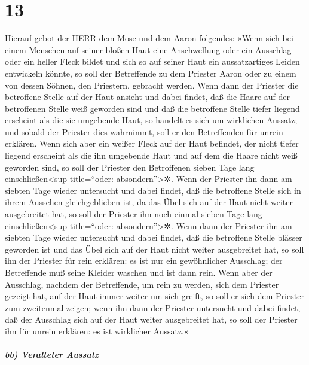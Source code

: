 \hypertarget{section-12}{%
\section{13}\label{section-12}}

Hierauf gebot der HERR dem Mose und dem Aaron folgendes:
»Wenn sich bei einem Menschen auf seiner bloßen Haut eine
Anschwellung oder ein Ausschlag oder ein heller Fleck bildet und sich so
auf seiner Haut ein aussatzartiges Leiden entwickeln könnte, so soll der
Betreffende zu dem Priester Aaron oder zu einem von dessen Söhnen, den
Priestern, gebracht werden. Wenn dann der Priester die
betroffene Stelle auf der Haut ansieht und dabei findet, daß die Haare
auf der betroffenen Stelle weiß geworden sind und daß die betroffene
Stelle tiefer liegend erscheint als die sie umgebende Haut, so handelt
es sich um wirklichen Aussatz; und sobald der Priester dies wahrnimmt,
soll er den Betreffenden für unrein erklären. Wenn sich
aber ein weißer Fleck auf der Haut befindet, der nicht tiefer liegend
erscheint als die ihn umgebende Haut und auf dem die Haare nicht weiß
geworden sind, so soll der Priester den Betroffenen sieben Tage lang
einschließen\textless sup title=``oder: absondern''\textgreater✲.
Wenn der Priester ihn dann am siebten Tage wieder
untersucht und dabei findet, daß die betroffene Stelle sich in ihrem
Aussehen gleichgeblieben ist, da das Übel sich auf der Haut nicht weiter
ausgebreitet hat, so soll der Priester ihn noch einmal sieben Tage lang
einschließen\textless sup title=``oder: absondern''\textgreater✲.
Wenn dann der Priester ihn am siebten Tage wieder
untersucht und dabei findet, daß die betroffene Stelle blässer geworden
ist und das Übel sich auf der Haut nicht weiter ausgebreitet hat, so
soll ihn der Priester für rein erklären: es ist nur ein gewöhnlicher
Ausschlag; der Betreffende muß seine Kleider waschen und ist dann rein.
Wenn aber der Ausschlag, nachdem der Betreffende, um rein
zu werden, sich dem Priester gezeigt hat, auf der Haut immer weiter um
sich greift, so soll er sich dem Priester zum zweitenmal zeigen;
wenn ihn dann der Priester untersucht und dabei findet,
daß der Ausschlag sich auf der Haut weiter ausgebreitet hat, so soll der
Priester ihn für unrein erklären: es ist wirklicher Aussatz.«

\hypertarget{bb-veralteter-aussatz}{%
\subparagraph{bb) Veralteter Aussatz}\label{bb-veralteter-aussatz}}

